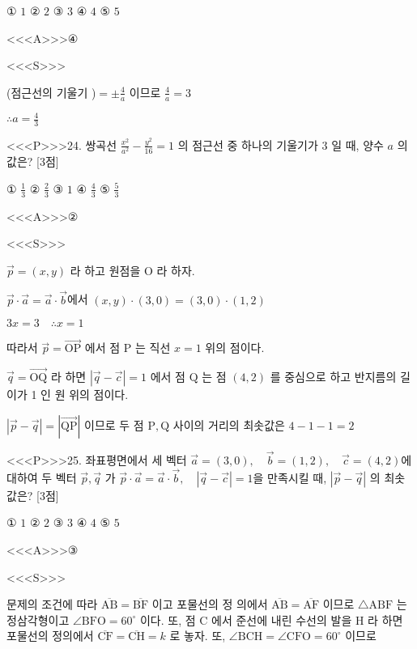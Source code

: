 \documentclass{oblivoir}
\begin{document}
① $1$
② $2$
③ $3$
④ $4$
⑤ $5$


<<<A>>>④

<<<S>>>



(점근선의 기울기 )$=\pm \frac{4}{a}$ 이므로 $\frac{4}{a}=3$

$\therefore a=\frac{4}{3}$


<<<P>>>24. 쌍곡선 $\frac{x^{2}}{a^{2}}-\frac{y^{2}}{16}=1$ 의 점근선 중 하나의 기울기가 3 일 때, 양수 $a$ 의 값은? [3점]

① $\frac{1}{3}$
② $\frac{2}{3}$
③ $1$
④ $\frac{4}{3}$
⑤ $\frac{5}{3}$


<<<A>>>②

<<<S>>>



$ \overrightarrow{p}=(x, y)$ 라 하고 원점을 $\mathrm{O}$ 라 하자.

$\overrightarrow{p} \cdot \overrightarrow{a}=\overrightarrow{a} \cdot \overrightarrow{b}$에서 $(x, y) \cdot(3,0)=(3,0) \cdot(1,2)$

$3 x=3 \quad \therefore x=1$

따라서 $\overrightarrow{p}=\overrightarrow{\mathrm{OP}}$ 에서 점 $\mathrm{P}$ 는 직선 $x=1$ 위의 점이다.

$\overrightarrow{q}=\overrightarrow{\mathrm{OQ}}$ 라 하면 $|\overrightarrow{q}-\overrightarrow{c}|=1$ 에서 점 $\mathrm{Q}$ 는 점 $(4,2)$ 를 중심으로 하고 반지름의 길이가 1 인 원 위의 점이다.

$|\overrightarrow{p}-\overrightarrow{q}|=|\overrightarrow{\mathrm{QP}}|$ 이므로 두 점 $\mathrm{P}, \mathrm{Q}$ 사이의 거리의 최솟값은 $4-1-1=2$


<<<P>>>25. 좌표평면에서 세 벡터 $\overrightarrow{a}=(3,0), \quad \overrightarrow{b}=(1,2), \quad \overrightarrow{c}=(4,2)$에 대하여 두 벡터 $\overrightarrow{p}, \overrightarrow{q}$ 가
$\overrightarrow{p} \cdot \overrightarrow{a}=\overrightarrow{a} \cdot \overrightarrow{b}, \quad|\overrightarrow{q}-\overrightarrow{c}|=1$을 만족시킬 때, $|\overrightarrow{p}-\overrightarrow{q}|$ 의 최솟값은? [3점]

① $1$
② $2$
③ $3$
④ $4$
⑤ $5$



<<<A>>>③

<<<S>>>



문제의 조건에 따라 $\overline{\mathrm{AB}}=\overline{\mathrm{BF}}$ 이고 포물선의 정 의에서 $\overline{\mathrm{AB}}=\overline{\mathrm{AF}}$ 이므로 $\triangle \mathrm{ABF}$ 는 정삼각형이고 $\angle \mathrm{BFO}=60^{\circ}$ 이다.
또, 점 $\mathrm{C}$ 에서 준선에 내린 수선의 발을 $\mathrm{H}$ 라 하면 포물선의 정의에서 $\overline{\mathrm{CF}}=\overline{\mathrm{CH}}=k$ 로 놓자.
또, $\angle \mathrm{BCH}=\angle \mathrm{CFO}=60^{\circ}$ 이므로
\end{document}
